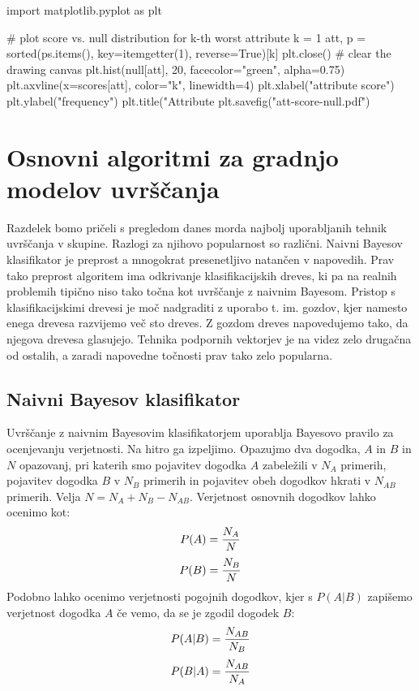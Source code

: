 \begin{python}
import matplotlib.pyplot as plt

# plot score vs. null distribution for k-th worst attribute
k = 1
att, p = sorted(ps.items(), key=itemgetter(1), reverse=True)[k]
plt.close() # clear the drawing canvas
plt.hist(null[att], 20, facecolor="green", alpha=0.75)
plt.axvline(x=scores[att], color="k", linewidth=4)
plt.xlabel("attribute score")
plt.ylabel("frequency")
plt.title("Attribute %
plt.savefig("att-score-null.pdf")
\end{python}

\section{Osnovni algoritmi za gradnjo modelov uvrščanja}

Razdelek bomo pričeli s pregledom danes morda najbolj uporabljanih tehnik uvrščanja v skupine. Razlogi za njihovo popularnost so različni. Naivni Bayesov klasifikator je preprost a mnogokrat presenetljivo natančen v napovedih. Prav tako preprost algoritem ima odkrivanje klasifikacijskih dreves, ki pa na realnih problemih tipično niso tako točna kot uvrščanje z naivnim Bayesom. Pristop s klasifikacijskimi drevesi je moč nadgraditi z uporabo t. im. gozdov, kjer namesto enega drevesa razvijemo več sto dreves. Z gozdom dreves napovedujemo tako, da njegova drevesa glasujejo. Tehnika podpornih vektorjev je na videz zelo drugačna od ostalih, a zaradi napovedne točnosti prav tako zelo popularna.

\subsection{Naivni Bayesov klasifikator}

Uvrščanje z naivnim Bayesovim klasifikatorjem uporablja Bayesovo pravilo za ocenjevanju verjetnosti. Na hitro ga izpeljimo. Opazujmo dva dogodka, $A$ in $B$ in $N$ opazovanj, pri katerih smo pojavitev dogodka $A$ zabeležili v $N_A$ primerih, pojavitev dogodka $B$ v $N_B$ primerih in pojavitev obeh dogodkov hkrati v $N_{AB}$ primerih. Velja $N=N_A+N_B-N_{AB}$. Verjetnost osnovnih dogodkov lahko ocenimo kot:
%
$$P(A)={N_A\over N}$$
$$P(B)={N_B\over N}$$
%
Podobno lahko ocenimo verjetnosti pogojnih dogodkov, kjer s $P(A|B)$ zapišemo verjetnost dogodka $A$ če vemo, da se je zgodil dogodek $B$:
%
$$ P(A|B)={N_{AB} \over N_{B}} $$
$$ P(B|A)={N_{AB} \over N_{A}} $$

